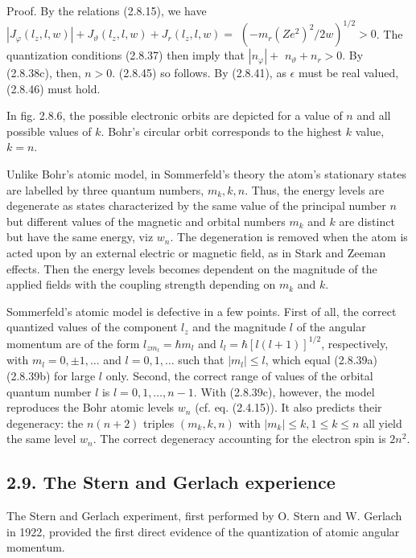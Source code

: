 \documentclass{article}
\begin{document}
Proof. By the relations (2.8.15), we have $\left|J_{\varphi}\left(l_{z}, l, w\right)\right|+J_{\vartheta}\left(l_{z}, l, w\right)+J_{r}\left(l_{z}, l, w\right)=$ $\left(-m_{r}\left(Z e^{2}\right)^{2} / 2 w\right)^{1 / 2}>0$. The quantization conditions (2.8.37) then imply that $\left|n_{\varphi}\right|+$ $n_{\vartheta}+n_{r}>0$. By (2.8.38c), then, $n>0$. (2.8.45) so follows. By (2.8.41), as $\epsilon$ must be real valued, (2.8.46) must hold.

In fig. 2.8.6, the possible electronic orbits are depicted for a value of $n$ and all possible values of $k$. Bohr's circular orbit corresponds to the highest $k$ value, $k=n$.

Unlike Bohr's atomic model, in Sommerfeld's theory the atom's stationary states are labelled by three quantum numbers, $m_{k}, k, n$. Thus, the energy levels are degenerate as states characterized by the same value of the principal number $n$ but different values of the magnetic and orbital numbers $m_{k}$ and $k$ are distinct but have the same energy, viz $w_{n}$. The degeneration is removed when the atom
is acted upon by an external electric or magnetic field, as in Stark and Zeeman effects. Then the energy levels becomes dependent on the magnitude of the applied fields with the coupling strength depending on $m_{k}$ and $k$.

Sommerfeld's atomic model is defective in a few points. First of all, the correct quantized values of the component $l_{z}$ and the magnitude $l$ of the angular momentum are of the form $l_{z m_{l}}=\hbar m_{l}$ and $l_{l}=\hbar[l(l+1)]^{1 / 2}$, respectively, with $m_{l}=0, \pm 1, \ldots$ and $l=0,1, \ldots$ such that $\left|m_{l}\right| \leq l$, which equal (2.8.39a) (2.8.39b) for large $l$ only. Second, the correct range of values of the orbital quantum number $l$ is $l=0,1, \ldots, n-1$. With (2.8.39c), however, the model reproduces the Bohr atomic levels $w_{n}$ (cf. eq. (2.4.15)). It also predicts their degeneracy: the $n(n+2)$ triples $\left(m_{k}, k, n\right)$ with $\left|m_{k}\right| \leq k, 1 \leq k \leq n$ all yield the same level $w_{n}$. The correct degeneracy accounting for the electron spin is $2 n^{2}$.

\subsection*{2.9. The Stern and Gerlach experience}

The Stern and Gerlach experiment, first performed by O. Stern and W. Gerlach in 1922, provided the first direct evidence of the quantization of atomic angular momentum.
\end{document}
